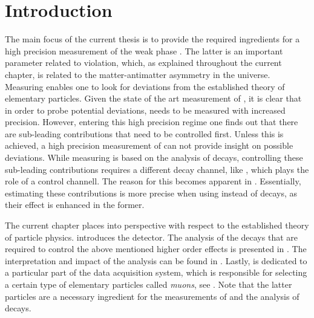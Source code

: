 
\chapter{Introduction}
\label{Introduction}

The main focus of the current thesis is to provide the required ingredients for a high precision measurement of
the weak phase \phis. The latter is an important parameter related to \CP violation, which, as explained throughout
the current chapter, is related to the matter-antimatter asymmetry in the universe. Measuring \phis enables one to look
for deviations from the established theory of elementary particles. Given the state of the art measurement of \phis \cite{phis-3fb-paper},
it is clear that in order to probe potential deviations, \phis needs to be measured with increased precision.
However, entering this high precision regime one finds out that there are sub-leading contributions that need to be
controlled first. Unless this is achieved, a high precision measurement of \phis can not provide insight on possible
deviations. While measuring \phis is based on the analysis of \BsJpsiPhi decays, controlling these sub-leading contributions
requires a different decay channel, like \BsJpsiKst, which plays the role of a control channell. The reason for this becomes apparent in .
Essentially, estimating these contributions is more precise when using \BsJpsiKst instead of \BsJpsiPhi decays,
as their effect is enhanced in the former.

The current chapter places \phis into perspective with respect to the established theory of particle physics.
 introduces the \lhcb detector. The analysis of the \BsJpsiKst decays that are
required to control the above mentioned higher order effects is presented in .
The interpretation and impact of the analysis can be found in .
Lastly,  is dedicated to a particular part of the \lhcb data acquisition system,
which is responsible for selecting a certain type of elementary particles called {\it muons}, see .
Note that the latter particles are a necessary ingredient for the measurements of \phis and
the analysis of \BsJpsiKst decays.

